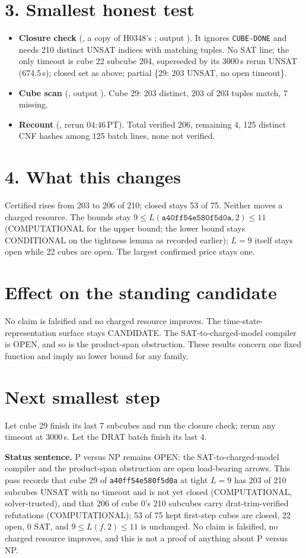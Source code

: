 \documentclass[11pt]{article}
\begin{document}
\section*{3. Smallest honest test}
\begin{itemize}
\item \textbf{Closure check} (, a copy of H0348's ; output ). It ignores \texttt{CUBE-DONE} and needs 210 distinct UNSAT indices with matching tuples. No SAT line; the only timeout is cube 22 subcube 204, superseded by its 3000\,s rerun UNSAT (674.5\,s); closed set as above; partial \{29: 203 UNSAT, no open timeout\}.
\item \textbf{Cube scan} (, output ). Cube 29: 203 distinct, 203 of 203 tuples match, 7 missing.
\item \textbf{Recount} (, rerun 04:46\,PT). Total verified 206, remaining 4, 125 distinct CNF hashes among 125 batch lines, none not verified.
\end{itemize}

\section*{4. What this changes}
Certified rises from 203 to 206 of 210; closed stays 53 of 75. Neither moves a charged resource. The bounds stay $9\le L(\texttt{a40ff54e580f5d0a},2)\le 11$ (COMPUTATIONAL for the upper bound; the lower bound stays CONDITIONAL on the tightness lemma as recorded earlier); $L=9$ itself stays open while 22 cubes are open. The largest confirmed price stays one.

\section*{Effect on the standing candidate}
No claim is falsified and no charged resource improves. The time-state-representation surface stays CANDIDATE. The SAT-to-charged-model compiler is OPEN, and so is the product-span obstruction. These results concern one fixed function and imply no lower bound for any family.

\section*{Next smallest step}
Let cube 29 finish its last 7 subcubes and run the closure check; rerun any timeout at 3000\,s. Let the DRAT batch finish its last 4.

\bigskip
\noindent\textbf{Status sentence.} P versus NP remains OPEN: the SAT-to-charged-model compiler and the product-span obstruction are open load-bearing arrows. This pass records that cube 29 of \texttt{a40ff54e580f5d0a} at tight $L=9$ has 203 of 210 subcubes UNSAT with no timeout and is not yet closed (COMPUTATIONAL, solver-trusted), and that 206 of cube 0's 210 subcubes carry drat-trim-verified refutations (COMPUTATIONAL); 53 of 75 kept first-step cubes are closed, 22 open, 0 SAT, and $9\le L(f,2)\le 11$ is unchanged. No claim is falsified, no charged resource improves, and this is not a proof of anything about P versus NP.
\end{document}
